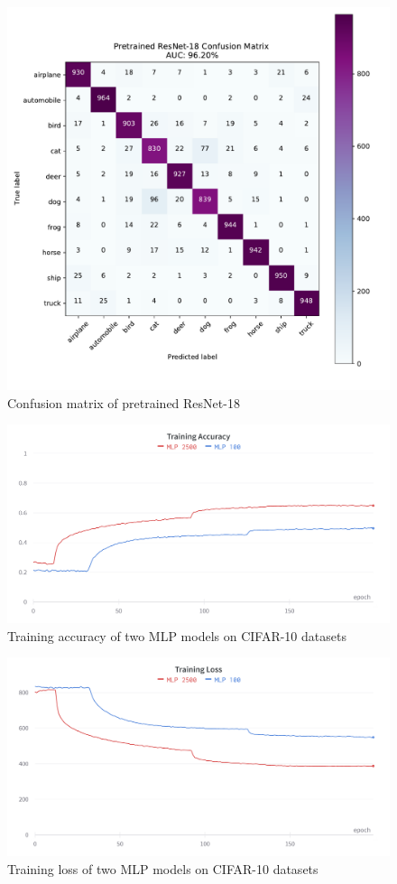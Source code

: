 \documentclass[twocolumn]{extarticle}
\begin{document}
\begin{appendices}
\begin{figure}[H]
\centering
\includegraphics[width=0.9\linewidth]{"charts/resnet-cifar-conf"}
\caption{Confusion matrix of pretrained ResNet-18}
\label{fig:resnet-cifar-conf}
\end{figure}

\begin{figure}[H]
\centering
\includegraphics[width=0.9\linewidth]{charts/mlp_cifar_10_train_acc}
\caption{Training accuracy of two MLP models on CIFAR-10 datasets}
\label{chart: mlp_1}
\end{figure}

\begin{figure}[H]
\centering
\includegraphics[width=0.9\linewidth]{charts/mlp_cifar_10_train_loss}
\caption{Training loss of two MLP models on CIFAR-10 datasets}
\label{chart: mlp_2}
\end{figure}


\end{appendices}
\end{document}
